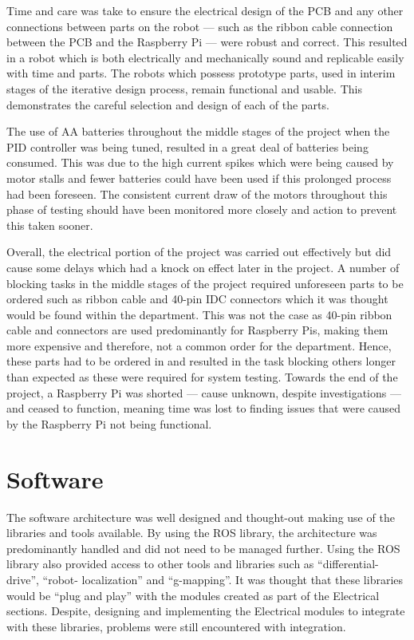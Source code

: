 Time and care was take to ensure the electrical design of the PCB and any other 
connections between parts on the robot --- such as the ribbon cable connection 
between the PCB and the Raspberry Pi --- were robust and correct. This resulted 
in a robot which is both electrically and mechanically sound and replicable 
easily with time and parts. The robots which possess prototype parts, used in 
interim stages of the iterative design process, remain functional and usable. 
This demonstrates the careful selection and design of each of the parts. 

The use of AA batteries throughout the middle stages of the project when the PID 
controller was being tuned, resulted in a great deal of batteries being consumed. 
This was due to the high current spikes which were being caused by motor stalls and 
fewer batteries could have been used if this prolonged process had been foreseen. The 
consistent current draw of the motors throughout this phase of testing should have 
been monitored more closely and action to prevent this taken sooner.   

Overall, the electrical portion of the project was carried out effectively but did 
cause some delays which had a knock on effect later in the project. A number of 
blocking tasks in the middle stages of the project required unforeseen parts to be 
ordered such as ribbon cable and 40-pin IDC connectors which it was thought would 
be found within the department. This was not the case as 40-pin ribbon cable and 
connectors are used predominantly for Raspberry Pis, making them more expensive 
and therefore, not a common order for the department. Hence, these parts had to be ordered in and resulted in the task blocking 
others longer than expected as these were required for system testing. Towards the end of the project, a Raspberry Pi was 
shorted --- cause unknown, despite investigations --- and ceased to function, 
meaning time was lost to finding issues that were caused by the Raspberry Pi not 
being functional.    
 
\section{Software}\label{eval/soft}
The software architecture was well designed and thought-out making use of the 
libraries and tools available. By using the ROS library, the architecture was predominantly handled
and did not need to be managed further. Using the ROS library also provided 
access to other tools and libraries such as ``differential-drive'', ``robot-
localization'' and ``g-mapping''. It was thought that these libraries would be ``plug 
and play'' with the modules created as part of the Electrical sections. Despite, 
designing and implementing the Electrical modules to integrate with these libraries, 
problems were still encountered with integration. 

